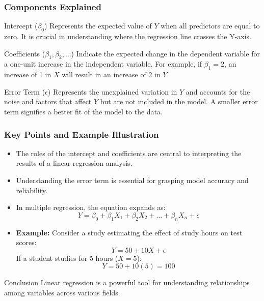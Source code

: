 \documentclass[aspectratio=169]{beamer}
\begin{document}
\begin{frame}[fragile]
    \frametitle{Components Explained}
    \begin{block}{Intercept (\(\beta_0\))}
        Represents the expected value of \(Y\) when all predictors are equal to zero. It is crucial in understanding where the regression line crosses the Y-axis.
    \end{block}
    \begin{block}{Coefficients (\(\beta_1, \beta_2, \ldots\))}
        Indicate the expected change in the dependent variable for a one-unit increase in the independent variable. For example, if \(\beta_1 = 2\), an increase of 1 in \(X\) will result in an increase of 2 in \(Y\).
    \end{block}
    \begin{block}{Error Term (\(\epsilon\))}
        Represents the unexplained variation in \(Y\) and accounts for the noise and factors that affect \(Y\) but are not included in the model. A smaller error term signifies a better fit of the model to the data.
    \end{block}
\end{frame}

\begin{frame}[fragile]
    \frametitle{Key Points and Example Illustration}
    \begin{itemize}
        \item The roles of the intercept and coefficients are central to interpreting the results of a linear regression analysis.
        \item Understanding the error term is essential for grasping model accuracy and reliability.
        \item In multiple regression, the equation expands as:
        \begin{equation}
        Y = \beta_0 + \beta_1 X_1 + \beta_2 X_2 + \ldots + \beta_n X_n + \epsilon
        \end{equation}
        \item \textbf{Example:} Consider a study estimating the effect of study hours on test scores:
        \begin{equation}
        Y = 50 + 10X + \epsilon
        \end{equation}
        If a student studies for 5 hours (\(X = 5\)):
        \begin{equation}
        Y = 50 + 10(5) = 100
        \end{equation}
    \end{itemize}
    \begin{block}{Conclusion}
        Linear regression is a powerful tool for understanding relationships among variables across various fields.
    \end{block}
\end{frame}
\end{document}
